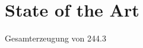 \section{State of the Art}

\lipsum



Gesamterzeugung von \SI{244.3}{\twh}

\lipsum



\lipsum



\lipsum
